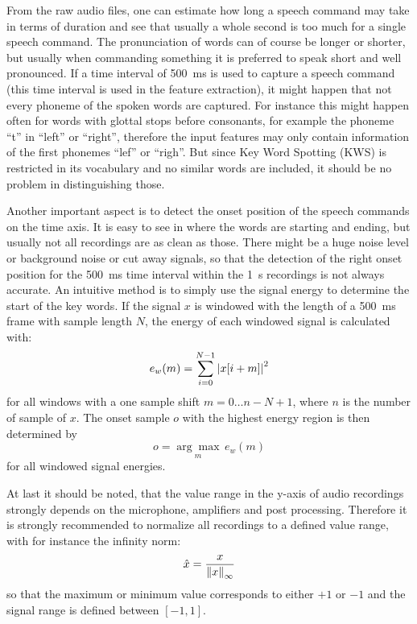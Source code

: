 \noindent
From the raw audio files, one can estimate how long a speech command may take in terms of duration and see that usually a whole second is too much for a single speech command.
The pronunciation of words can of course be longer or shorter, but usually when commanding something it is preferred to speak short and well pronounced.
If a time interval of \SI{500}{\milli\second} is used to capture a speech command (this time interval is used in the feature extraction), it might happen that not every phoneme of the spoken words are captured. 
For instance this might happen often for words with glottal stops before consonants, for example the phoneme \enquote{t} in \enquote{left} or \enquote{right}, therefore the input features may only contain information of the first phonemes \enquote{lef} or \enquote{righ}.
But since Key Word Spotting (KWS) is restricted in its vocabulary and no similar words are included, it should be no problem in distinguishing those.

Another important aspect is to detect the onset position of the speech commands on the time axis. 
It is easy to see in  where the words are starting and ending, but usually not all recordings are as clean as those.
There might be a huge noise level or background noise or cut away signals, so that the detection of the right onset position for the \SI{500}{\milli\second} time interval within the \SI{1}{\second} recordings is not always accurate.
An intuitive method is to simply use the signal energy to determine the start of the key words.
If the signal $x$ is windowed with the length of a \SI{500}{\milli\second} frame with sample length $N$, the energy of each windowed signal is calculated with:
\begin{equation}
  e_{w}(m) = \sum_{i=0}^{N-1} \abs{x[i + m]}^2
\end{equation}
for all windows with a one sample shift $m = 0 \dots n - N + 1$, where $n$ is the number of sample of $x$.
The onset sample $o$ with the highest energy region is then determined by
\begin{equation}
  o = \underset{m}{\arg \max} \, e_{w}(m)
\end{equation}
for all windowed signal energies.

At last it should be noted, that the value range in the y-axis of audio recordings strongly depends on the microphone, amplifiers and post processing.
Therefore it is strongly recommended to normalize all recordings to a defined value range, with for instance the infinity norm:
\begin{equation}
  \hat{x} = \frac{x}{\norm{x}_\infty}
\end{equation}
so that the maximum or minimum value corresponds to either $+1$ or $-1$ and the signal range is defined between $[-1, 1]$.